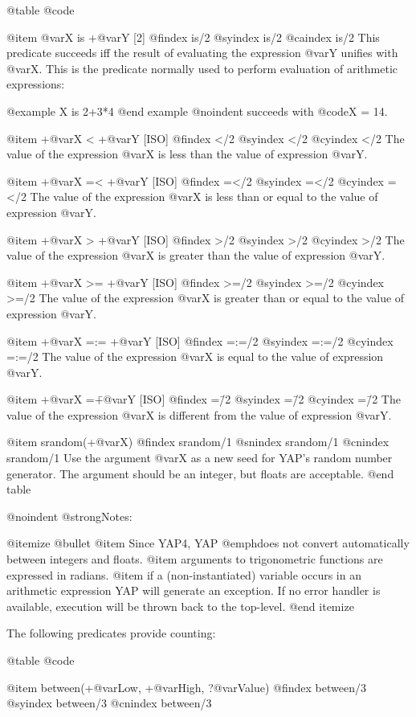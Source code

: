 {{{{@table @code

@item @var{X} is +@var{Y} [2]
@findex is/2
@syindex is/2
@caindex is/2
This predicate succeeds iff the result of evaluating the expression
@var{Y} unifies with @var{X}. This is the predicate normally used to
perform evaluation of arithmetic expressions:

@example
X is 2+3*4
@end example
@noindent
succeeds with @code{X = 14}.

@item +@var{X} < +@var{Y} [ISO]
@findex </2
@syindex </2
@cyindex </2
The value of the expression @var{X} is less than the value of expression
@var{Y}.

@item +@var{X} =< +@var{Y} [ISO]
@findex =</2
@syindex =</2
@cyindex =</2
The value of the expression @var{X} is less than or equal to the value
of expression @var{Y}.


@item +@var{X} > +@var{Y} [ISO]
@findex >/2
@syindex >/2
@cyindex >/2
The value of the expression @var{X} is greater than the value of
expression @var{Y}.

@item +@var{X} >= +@var{Y} [ISO]
@findex >=/2
@syindex >=/2
@cyindex >=/2
The value of the expression @var{X} is greater than or equal to the
value of expression @var{Y}.

@item +@var{X} =:= +@var{Y} [ISO]
@findex =:=/2
@syindex =:=/2
@cyindex =:=/2
The value of the expression @var{X} is equal to the value of expression
@var{Y}.

@item +@var{X} =\= +@var{Y} [ISO]
@findex =\=/2
@syindex =\=/2
@cyindex =\=/2
The value of the expression @var{X} is different from the value of
expression @var{Y}.

@item srandom(+@var{X})
@findex srandom/1
@snindex srandom/1
@cnindex srandom/1
Use the argument @var{X} as a new seed for YAP's random number
generator. The argument should be an integer, but floats are acceptable.
@end table

@noindent
@strong{Notes:}

@itemize @bullet
@item 
Since YAP4, YAP @emph{does not} convert automatically between integers
and floats.
@item
arguments to trigonometric functions are expressed in radians.
@item
if a (non-instantiated) variable occurs in an arithmetic expression YAP
will generate an exception. If no error handler is available, execution
will be thrown back to the top-level.
@end itemize


The following predicates provide counting:

@table @code

@item between(+@var{Low}, +@var{High}, ?@var{Value})
@findex between/3
@syindex between/3
@cnindex between/3

}}}}
